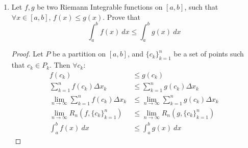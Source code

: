 \documentclass{article}
\newcommand{\<}{\langle}
\renewcommand{\>}{\rangle}
\begin{document}
\begin{enumerate}[(E1)]
\begin{enumerate}
    Prove the original statement using the fact that a Riemann integral can be rewritten as the limit of a Riemann sum.
    \begin{proof}
     Let $\{c_k\}_{k=1}^n$, such that $c_k \in P_k$, then
    \begin{align*}
    \int_a^b \left(f(x)+g(x)\right)\ dx &= \lim_{n \to \infty} R_n\left(f+g, \{c_k\}_{k=1}^n\right)\\
    &= \lim_{n \to \infty} \sum_{k=1}^n \left(f(c_k)+g(c_k)\right) \Delta x_k\\
    &= \lim_{n \to \infty} \sum_{k=1}^n f(c_k) \Delta x_k + \lim_{n \to \infty} \sum_{k=1}^n g(c_k) \Delta x_k\\
    &= \lim_{n \to \infty} R_n\left(f(x), \{c_k\}_{k=1}^n\right) + \lim_{n \to \infty} R_n\left(g(x), \{c_k\}_{k=1}^n\right)\\
    \int_a^b \left(f(x)+g(x)\right)\ dx &= \int_a^b f(x)\ dx + \int_a^b g(x)\ dx
    \end{align*}
    \end{proof}
    \end{enumerate}
    
    \item Let $f,g$ be two Riemann Integrable functions on $[a,b]$, such that $\forall x \in [a,b]$, $f(x) \leq g(x)$. Prove that 
    $$
    \int_a^b f(x)\ dx \leq \int_a^b g(x)\ dx
    $$
    \begin{proof}
    Let $P$ be a partition on $[a,b]$, and $\{c_k\}_{k=1}^n$ be
	a set of points such that $c_k \in P_k$. Then $\forall c_k$:
	\begin{align*}
	f(c_k) &\leq g(c_k)\\
	\sum_{k=1}^n f(c_k)\Delta x_k &\leq \sum_{k=1}^n g(c_k)\Delta x_k\\
	\lim_{n\to \infty}\sum_{k=1}^n f(c_k)\Delta x_k &\leq \lim_{n\to\infty}\sum_{k=1}^n g(c_k)\Delta x_k\\
	\lim_{n\to \infty}R_n\left(f, \{c_k\}_{k=1}^n\right) &\leq \lim_{n\to\infty}R_n\left(g, \{c_k\}_{k=1}^n\right)\\
	\int_a^b f(x)\ dx &\leq \int_a^b g(x)\ dx
	\end{align*}
		    
    \end{proof}
\end{enumerate}
\end{document}
